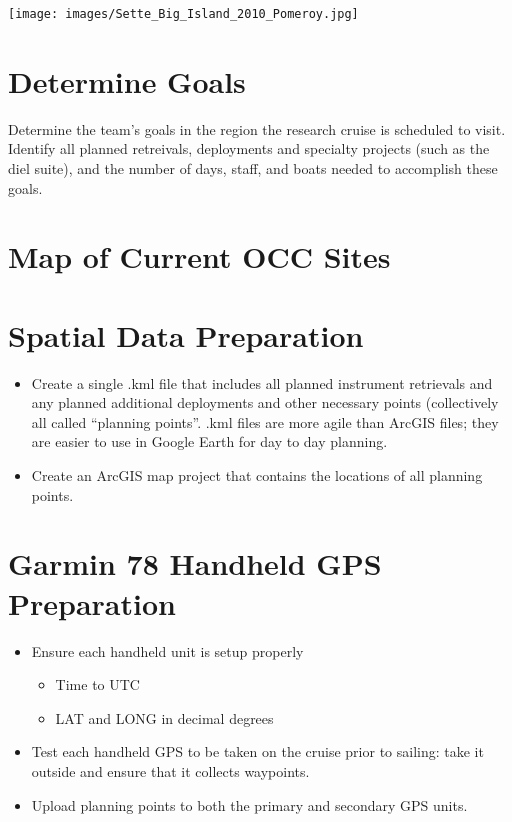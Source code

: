 \documentclass[]{book}
\providecommand{\tightlist}{%
  \setlength{\itemsep}{0pt}\setlength{\parskip}{0pt}}
\begin{document}
\texttt{[image: images/Sette\_Big\_Island\_2010\_Pomeroy.jpg]}

\hypertarget{determine-goals}{%
\section{Determine Goals}\label{determine-goals}}

Determine the team's goals in the region the research cruise is scheduled to visit. Identify all planned retreivals, deployments and specialty projects (such as the diel suite), and the number of days, staff, and boats needed to accomplish these goals.

\hypertarget{map-of-current-occ-sites}{%
\section{Map of Current OCC Sites}\label{map-of-current-occ-sites}}

\hypertarget{htmlwidget-da7f3c21fa1221acec0b}{}

\hypertarget{spatial-data-preparation}{%
\section{Spatial Data Preparation}\label{spatial-data-preparation}}

\begin{itemize}
\tightlist
\item
  Create a single .kml file that includes all planned instrument retrievals and any planned additional deployments and other necessary points (collectively all called ``planning points''. .kml files are more agile than ArcGIS files; they are easier to use in Google Earth for day to day planning.
\item
  Create an ArcGIS map project that contains the locations of all planning points.
\end{itemize}

\hypertarget{garmin-78-handheld-gps-preparation}{%
\section{Garmin 78 Handheld GPS Preparation}\label{garmin-78-handheld-gps-preparation}}

\begin{itemize}
\tightlist
\item
  Ensure each handheld unit is setup properly

  \begin{itemize}
  \tightlist
  \item
    Time to UTC
  \item
    LAT and LONG in decimal degrees
  \end{itemize}
\item
  Test each handheld GPS to be taken on the cruise prior to sailing: take it outside and ensure that it collects waypoints.
\item
  Upload planning points to both the primary and secondary GPS units.
\end{itemize}
\end{document}
